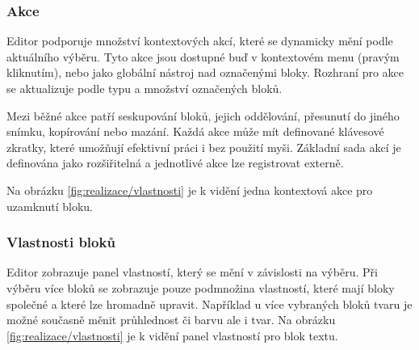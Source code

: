 






\subsubsection{Akce}

Editor podporuje množství kontextových akcí, které se dynamicky mění podle aktuálního výběru. 
Tyto akce jsou dostupné buď v kontextovém menu (pravým kliknutím), nebo jako globální nástroj nad označenými bloky. 
Rozhraní pro akce se aktualizuje podle typu a množství označených bloků.

Mezi běžné akce patří seskupování bloků, jejich oddělování, přesunutí do jiného snímku, kopírování nebo mazání. 
Každá akce může mít definované klávesové zkratky, které umožňují efektivní práci i bez použití myši. 
Základní sada akcí je definována jako rozšiřitelná a jednotlivé akce lze registrovat externě.

Na obrázku \ref{fig:realizace/vlastnosti} je k vidění jedna kontextová akce pro uzamknutí bloku.


\subsubsection{Vlastnosti bloků}

Editor zobrazuje panel vlastností, který se mění v závislosti na výběru. 
Při výběru více bloků se zobrazuje pouze podmnožina vlastností, které mají bloky společné a které lze hromadně upravit. 
Například u více vybraných bloků tvaru je možné současně měnit průhlednost či barvu ale i tvar.
Na obrázku \ref{fig:realizace/vlastnosti} je k vidění panel vlastností pro blok textu.


